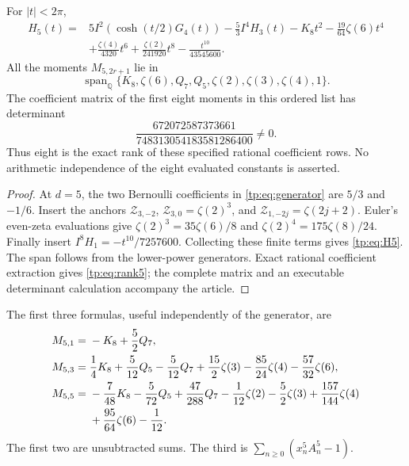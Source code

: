 \begin{theorem}
\label{tp:thm:five}
For $|t|<2\pi$,
\begin{equation}\label{tp:eq:H5}
 \boxed{\begin{aligned}
 H_5(t)={}&5I^2(\cosh(t/2)G_4(t))
            -\frac53I^4H_3(t)-K_8t^2
            -\frac{19}{64}\zeta(6)t^4\\
          &+\frac{\zeta(4)}{4320}t^6
            +\frac{\zeta(2)}{241920}t^8
            -\frac{t^{10}}{43545600}.
 \end{aligned}}
\end{equation}
All the moments $M_{5,2r+1}$ lie in
\begin{equation}\label{tp:eq:space5}
 \operatorname{span}_{\mathbb Q}
 \{K_8,\zeta(6),Q_7,Q_5,\zeta(2),\zeta(3),\zeta(4),1\}.
\end{equation}
The coefficient matrix of the first eight moments in this ordered
list has determinant
\begin{equation}\label{tp:eq:rank5}
 \frac{672072587373661}{748313054183581286400}\ne0.
\end{equation}
Thus eight is the exact rank of these specified rational coefficient
rows.  No arithmetic independence of the eight evaluated constants
is asserted.
\end{theorem}

\begin{proof}
At $d=5$, the two Bernoulli coefficients in \eqref{tp:eq:generator}
are $5/3$ and $-1/6$.  Insert the anchors
$\mathcal Z_{3,-2}$, $\mathcal Z_{3,0}=\zeta(2)^3$, and
$\mathcal Z_{1,-2j}=\zeta(2j+2)$.  Euler's even-zeta evaluations
give $\zeta(2)^3=35\zeta(6)/8$ and
$\zeta(2)^4=175\zeta(8)/24$.  Finally insert
$I^8H_1=-t^{10}/7257600$.  Collecting these finite terms gives
\eqref{tp:eq:H5}.  The span follows from the lower-power generators.
Exact rational coefficient extraction gives \eqref{tp:eq:rank5};
the complete matrix and an executable determinant calculation accompany
the article.
\end{proof}

The first three formulas, useful independently of the generator, are
\begin{align}
 M_{5,1}={}&-K_8+\frac52Q_7,\label{tp:eq:M51}\\
 M_{5,3}={}&\frac14K_8+\frac5{12}Q_5-\frac5{12}Q_7
           +\frac{15}{2}\zeta(3)-\frac{85}{24}\zeta(4)
           -\frac{57}{32}\zeta(6),\label{tp:eq:M53}\\
 M_{5,5}={}&-\frac7{48}K_8-\frac5{72}Q_5+\frac{47}{288}Q_7
           -\frac1{12}\zeta(2)-\frac52\zeta(3)
           +\frac{157}{144}\zeta(4)\notag\\
          &+\frac{95}{64}\zeta(6)-\frac1{12}.
          \label{tp:eq:M55}
\end{align}
The first two are unsubtracted sums.  The third is
$\sum_{n\geq0}(x_n^5A_n^5-1)$.

